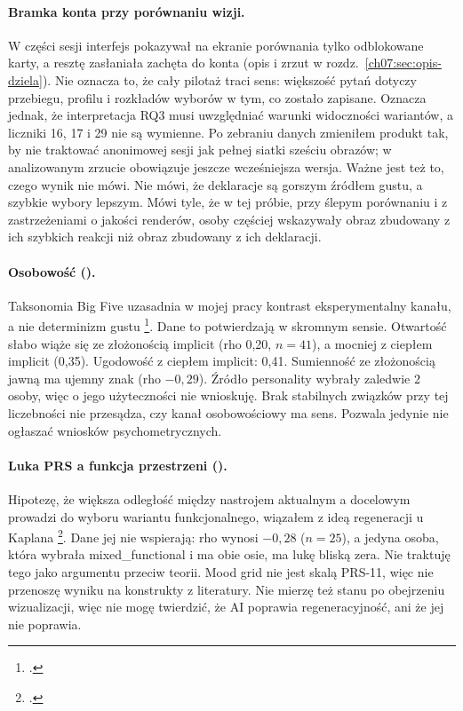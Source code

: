 \paragraph{Bramka konta przy porównaniu wizji.}
W części sesji interfejs pokazywał na ekranie porównania tylko odblokowane karty, a resztę zasłaniała zachęta do konta (opis i zrzut w rozdz.~\ref{ch07:sec:opis-dziela}). Nie oznacza to, że cały pilotaż traci sens: większość pytań dotyczy przebiegu, profilu i rozkładów wyborów w tym, co zostało zapisane. Oznacza jednak, że interpretacja RQ3 musi uwzględniać warunki widoczności wariantów, a liczniki 16, 17 i 29 nie są wymienne. Po zebraniu danych zmieniłem produkt tak, by nie traktować anonimowej sesji jak pełnej siatki sześciu obrazów; w analizowanym zrzucie obowiązuje jeszcze wcześniejsza wersja.
Ważne jest też to, czego wynik nie mówi. Nie mówi, że deklaracje są gorszym źródłem gustu, a szybkie wybory lepszym. Mówi tyle, że w tej próbie, przy ślepym porównaniu i z zastrzeżeniami o jakości renderów, osoby częściej wskazywały obraz zbudowany z ich szybkich reakcji niż obraz zbudowany z ich deklaracji.

\paragraph{Osobowość ().}
Taksonomia Big Five uzasadnia w mojej pracy kontrast eksperymentalny kanału, a nie determinizm gustu \footcite{john2008bigfive}. Dane to potwierdzają w skromnym sensie. Otwartość słabo wiąże się ze złożonością implicit (rho 0,20, $n=41$), a mocniej z ciepłem implicit (0,35). Ugodowość z ciepłem implicit: 0,41. Sumienność ze złożonością jawną ma ujemny znak (rho $-0{,}29$).
Źródło personality wybrały zaledwie 2 osoby, więc o jego użyteczności nie wnioskuję. Brak stabilnych związków przy tej liczebności nie przesądza, czy kanał osobowościowy ma sens. Pozwala jedynie nie ogłaszać wniosków psychometrycznych.

\paragraph{Luka PRS a funkcja przestrzeni ().}
Hipotezę, że większa odległość między nastrojem aktualnym a docelowym prowadzi do wyboru wariantu funkcjonalnego, wiązałem z ideą regeneracji u Kaplana \footcite{kaplan1995restorative}. Dane jej nie wspierają: rho wynosi $-0{,}28$ ($n=25$), a jedyna osoba, która wybrała mixed\_functional i ma obie osie, ma lukę bliską zera.
Nie traktuję tego jako argumentu przeciw teorii. Mood grid nie jest skalą PRS-11, więc nie przenoszę wyniku na konstrukty z literatury. Nie mierzę też stanu po obejrzeniu wizualizacji, więc nie mogę twierdzić, że AI poprawia regeneracyjność, ani że jej nie poprawia.

